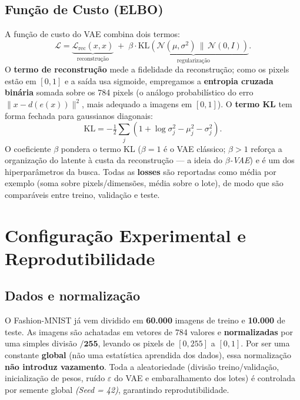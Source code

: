 \documentclass[11pt,a4paper]{article}
\begin{document}
\subsection{Função de Custo (ELBO)}
A função de custo do VAE combina dois termos:
\begin{equation}
    \mathcal{L} = \underbrace{\mathcal{L}_{\text{rec}}(x, \hat{x})}_{\text{reconstrução}}
    \; + \; \beta \cdot \underbrace{\mathrm{KL}\!\left(\mathcal{N}(\mu, \sigma^2)\,\|\,\mathcal{N}(0, I)\right)}_{\text{regularização}}.
\end{equation}
O \textbf{termo de reconstrução} mede a fidelidade da reconstrução; como os pixels estão em $[0,1]$ e a saída usa sigmoide, empregamos a \textbf{entropia cruzada binária} somada sobre os 784 pixels (o análogo probabilístico do erro $\|x - d(e(x))\|^2$, mais adequado a imagens em $[0,1]$). O \textbf{termo KL} tem forma fechada para gaussianos diagonais:
\begin{equation}
    \mathrm{KL} = -\tfrac{1}{2}\sum_{j} \left( 1 + \log\sigma_j^2 - \mu_j^2 - \sigma_j^2 \right).
\end{equation}
O coeficiente $\beta$ pondera o termo KL ($\beta=1$ é o VAE clássico; $\beta>1$ reforça a organização do latente à custa da reconstrução --- a ideia do \textit{$\beta$-VAE}) e é um dos hiperparâmetros da busca. Todas as \textbf{losses} são reportadas como média por exemplo (soma sobre pixels/dimensões, média sobre o lote), de modo que são comparáveis entre treino, validação e teste.

\section{Configuração Experimental e Reprodutibilidade}

\subsection{Dados e normalização}
O Fashion-MNIST já vem dividido em \textbf{60.000} imagens de treino e \textbf{10.000} de teste. As imagens são achatadas em vetores de 784 valores e \textbf{normalizadas} por uma simples divisão $\mathbf{/255}$, levando os pixels de $[0,255]$ a $[0,1]$. Por ser uma constante \textbf{global} (não uma estatística aprendida dos dados), essa normalização \textbf{não introduz vazamento}. Toda a aleatoriedade (divisão treino/validação, inicialização de pesos, ruído $\varepsilon$ do VAE e embaralhamento dos lotes) é controlada por semente global \textit{(Seed = 42)}, garantindo reprodutibilidade.
\end{document}
